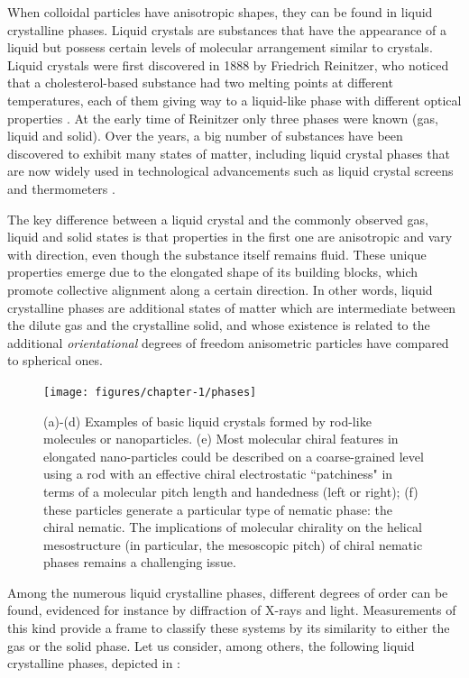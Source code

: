 When colloidal particles have anisotropic shapes, they can be found in liquid crystalline phases. Liquid crystals are substances that have the appearance of a liquid but possess certain levels of molecular arrangement similar to crystals. Liquid crystals were first discovered in 1888 by Friedrich Reinitzer, who noticed that a cholesterol-based substance had two melting points at different temperatures, each of them giving way to a liquid-like phase with different optical properties \cite{reinitzer1888beitrage}. At the early time of Reinitzer only three phases were known (gas, liquid and solid). Over the years, a big number of substances have been discovered to exhibit many states of matter, including liquid crystal phases that are now widely used in technological advancements such as liquid crystal screens and thermometers \cite{Li_2012}.

The key difference between a liquid crystal and the commonly observed gas, liquid and solid states is that properties in the first one are anisotropic and vary with direction, even though the substance itself remains fluid. These unique properties emerge due to the elongated shape of its building blocks, which promote collective alignment along a certain direction. In other words, liquid crystalline phases are additional states of matter which are intermediate between the dilute gas and the crystalline solid, and whose existence is related to the additional {\em orientational} degrees of freedom anisometric particles have compared to spherical ones.

\begin{figure}
\begin{center}
\texttt{[image: figures/chapter-1/phases]}
\caption{ \label{introfig1} (a)-(d) Examples of basic liquid crystals formed by rod-like molecules or nanoparticles. (e) Most molecular chiral features in elongated nano-particles  could be described on a coarse-grained level using a rod with an effective chiral electrostatic ``patchiness"  in terms of a molecular pitch length and handedness (left or right); (f) these particles generate a particular type of nematic phase: the chiral nematic. The implications of molecular chirality on the helical mesostructure (in particular, the mesoscopic pitch) of chiral nematic phases remains a challenging issue.}
\end{center}
\end{figure}

Among the numerous liquid crystalline phases, different degrees of order can be found, evidenced for instance by diffraction of X-rays and light. Measurements of this kind provide a frame to classify these systems by its similarity to either the gas or the solid phase. Let us consider, among others, the following liquid crystalline phases, depicted in :

